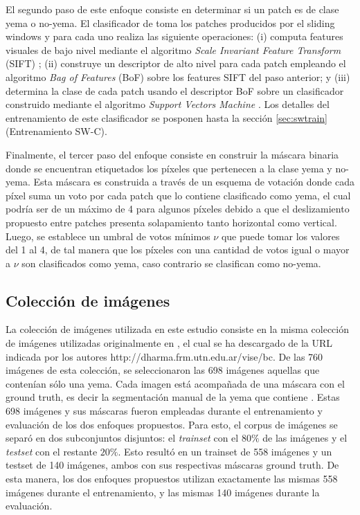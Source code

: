 \documentclass[a4paper,authoryear,review]{elsarticle}
\begin{document}
El segundo paso de este enfoque consiste en determinar si un patch es de clase yema o no-yema. El clasificador de \citet{perez2017image} toma los patches producidos por el sliding windows y para cada uno realiza las siguiente operaciones: (i) computa features visuales de bajo nivel mediante el algoritmo \emph{Scale Invariant Feature Transform} (SIFT) \cite{lowe2004distinctive}; (ii) construye un descriptor de alto nivel para cada patch empleando el algoritmo \emph{Bag of Features} (BoF) \cite{csurka2004visual} sobre los features SIFT del paso anterior; y (iii) determina la clase de cada patch usando el descriptor BoF sobre un clasificador construido mediante el algoritmo \emph{Support Vectors Machine} \cite{vapnik2013nature}. Los detalles del entrenamiento de este clasificador se posponen hasta la sección \ref{sec:swtrain} (Entrenamiento SW-C).

Finalmente, el tercer paso del enfoque consiste en construir la máscara binaria donde se encuentran etiquetados los píxeles que pertenecen a la clase yema y no-yema. Esta máscara es construida a través de un esquema de votación donde cada píxel suma un voto por cada patch que lo contiene clasificado como yema, el cual podría ser de un máximo de 4 para algunos píxeles debido a que el deslizamiento propuesto entre patches presenta solapamiento tanto horizontal como vertical. Luego, se establece un umbral de votos mínimos $\nu$ que puede tomar los valores del 1 al 4, de tal manera que los píxeles con una cantidad de votos igual o mayor a $\nu$ son clasificados como yema, caso contrario se clasifican como no-yema.

\subsection{Colección de imágenes}
\label{sec:corpus}

La colección de imágenes utilizada en este estudio consiste en la misma colección de imágenes utilizadas originalmente en \citet{perez2017image}, el cual se ha descargado de la URL indicada por los autores http://dharma.frm.utn.edu.ar/vise/bc. 
De las 760 imágenes de esta colección, se seleccionaron las 698 imágenes aquellas que contenían sólo una yema. Cada imagen está acompañada de una máscara con el ground truth, es decir la segmentación manual de la yema que contiene . Estas 698 imágenes y sus máscaras fueron empleadas durante el entrenamiento y evaluación de los dos enfoques propuestos. Para esto, el corpus de imágenes se separó en dos subconjuntos disjuntos: el \emph{trainset} con el $80\%$ de las imágenes y el \emph{testset} con el restante $20\%$. Esto resultó en un trainset de 558 imágenes y un testset de 140 imágenes, ambos con sus respectivas máscaras ground truth. De esta manera, los dos enfoques propuestos utilizan exactamente las mismas 558 imágenes durante el entrenamiento, y las mismas 140 imágenes durante la evaluación.
\end{document}
